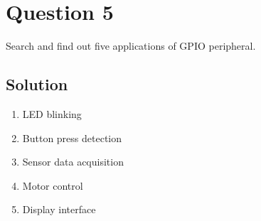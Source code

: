 \section*{Question 5}

Search and find out five applications of GPIO peripheral.

\subsection*{Solution}

\begin{enumerate}[itemsep=0mm]
    \item LED blinking
    \item Button press detection
    \item Sensor data acquisition
    \item Motor control
    \item Display interface
\end{enumerate}
